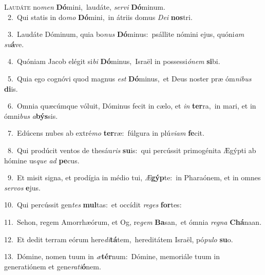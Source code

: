 \lettrine{\initial\textcolor{\initialcolor}{L}}{audáte} no\textit{men} \textbf{Dó}\-mini,~\star laudáte, \textit{ser}\-\textit{vi} \textbf{Dó}\-minum.\\
{\numbfont\textcolor{\numbcolor}{~2.}}~Qui statis in do\textit{mo} \textbf{Dó}\-mini,~\star in átriis domus \textit{De}\-\textit{i} \textbf{nos}\-tri.\par
{\numbfont\textcolor{\numbcolor}{~3.}}~Laudáte Dóminum, quia bo\textit{nus} \textbf{Dó}\-minus:~\star psállite nómini ejus, quóni\textit{am} \textit{su}\-\textbf{á}ve.\par
{\numbfont\textcolor{\numbcolor}{~4.}}~Quóniam Jacob elégit si\textit{bi} \textbf{Dó}\-minus,~\star Israël in possessi\-\textit{ó}\-\textit{nem} \textbf{si}\-bi.\par
{\numbfont\textcolor{\numbcolor}{~5.}}~Quia ego cognóvi quod magnus \textit{est} \textbf{Dó}\-minus,~\star et Deus noster præ óm\-\textit{ni}\-\textit{bus} \textbf{di}\-is.\par
{\numbfont\textcolor{\numbcolor}{~6.}}~Omnia quæcúmque vóluit, Dóminus fecit in cælo, et \textit{in} \textbf{ter}\-ra,~\star in mari, et in ómni\textit{bus} \textit{a}\-\textbf{býs}sis.\par
{\numbfont\textcolor{\numbcolor}{~7.}}~Edúcens nubes ab extré\textit{mo} \textbf{ter}\-ræ:~\star fúlgura in plú\-\textit{vi}\-\textit{am} \textbf{fe}\-cit.\par
{\numbfont\textcolor{\numbcolor}{~8.}}~Qui prodúcit ventos de thesáu\textit{ris} \textbf{su}\-is:~\star qui percússit primogénita Ægýpti ab hómine us\textit{que} \textit{ad} \textbf{pe}\-cus.\par
{\numbfont\textcolor{\numbcolor}{~9.}}~Et misit signa, et prodígia in médio tui, \textit{Æ}\-\textbf{gýp}te:~\star in Pharaónem, et in omnes \textit{ser}\-\textit{vos} \textbf{e}\-jus.\par
{\numbfont\textcolor{\numbcolor}{10.}}~Qui percússit gen\textit{tes} \textbf{mul}\-tas:~\star et occídit \textit{re}\-\textit{ges} \textbf{for}\-tes:\par
{\numbfont\textcolor{\numbcolor}{11.}}~Sehon, regem Amorrhæórum, et Og, re\textit{gem} \textbf{Ba}\-san,~\star et ómnia \textit{re}\-\textit{gna} \textbf{Chá}\-naan.\par
{\numbfont\textcolor{\numbcolor}{12.}}~Et dedit terram eórum here\-\textit{di}\-\textbf{tá}tem,~\star hereditátem Israël, pó\-\textit{pu}\-\textit{lo} \textbf{su}\-o.\par
{\numbfont\textcolor{\numbcolor}{13.}}~Dómine, nomen tuum in \textit{æ}\-\textbf{tér}num:~\star Dómine, memoriále tuum in generatiónem et gene\-\textit{ra}\-\textit{ti}\textbf{ó}nem.\par
